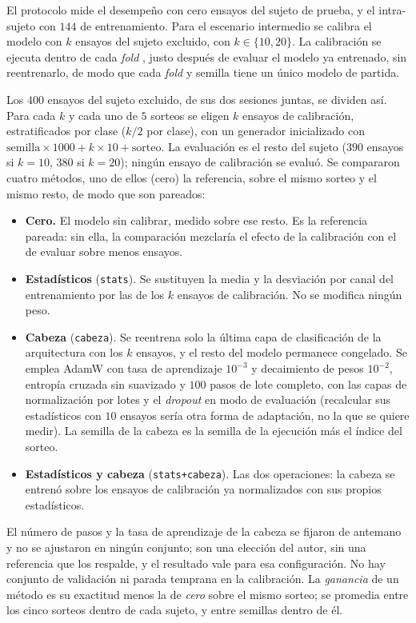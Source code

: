 El protocolo \loso{} mide el desempeño con cero ensayos del sujeto de prueba, y el
intra-sujeto con $144$ de entrenamiento. Para el escenario intermedio se calibra el modelo
con $k$ ensayos del sujeto excluido, con $k \in \{10, 20\}$. La calibración se ejecuta
dentro de cada \textit{fold} \loso{}, justo después de evaluar el modelo ya entrenado, sin
reentrenarlo, de modo que cada \textit{fold} y semilla tiene un único modelo de partida.

Los $400$ ensayos del sujeto excluido, de sus dos sesiones juntas, se dividen así. Para cada
$k$ y cada uno de $5$ sorteos se eligen $k$ ensayos de calibración, estratificados por clase
($k/2$ por clase), con un generador inicializado con $\mathrm{semilla}\times 1000 + k\times 10 +
\mathrm{sorteo}$. La evaluación es el resto del sujeto ($390$ ensayos si $k = 10$, $380$ si
$k = 20$); ningún ensayo de calibración se evaluó. Se compararon cuatro métodos, uno de ellos (cero) la referencia, sobre el mismo
sorteo y el mismo resto, de modo que son pareados:

\begin{itemize}
  \item \textbf{Cero.} El modelo \loso{} sin calibrar, medido sobre ese resto. Es la
  referencia pareada: sin ella, la comparación mezclaría el efecto de la calibración con el
  de evaluar sobre menos ensayos.
  \item \textbf{Estadísticos} (\texttt{stats}). Se sustituyen la media y la desviación por canal del
  entrenamiento por las de los $k$ ensayos de calibración. No se modifica ningún peso.
  \item \textbf{Cabeza} (\texttt{cabeza}). Se reentrena solo la última capa de clasificación de la
  arquitectura con los $k$ ensayos, y el resto del modelo permanece congelado. Se emplea
  AdamW con tasa de aprendizaje $10^{-3}$ y decaimiento de pesos $10^{-2}$, entropía cruzada
  sin suavizado y $100$ pasos de lote completo, con las capas de normalización por lotes y
  el \textit{dropout} en modo de evaluación (recalcular sus estadísticos con $10$ ensayos
  sería otra forma de adaptación, no la que se quiere medir). La semilla de la cabeza es la
  semilla de la ejecución más el índice del sorteo.
  \item \textbf{Estadísticos y cabeza} (\texttt{stats+cabeza}). Las dos operaciones: la cabeza se entrenó sobre los
  ensayos de calibración ya normalizados con sus propios estadísticos.
\end{itemize}

El número de pasos y la tasa de aprendizaje de la cabeza se fijaron de antemano y no se
ajustaron en ningún conjunto; son una elección del autor, sin una referencia que los respalde, y el
resultado vale para esa configuración. No hay conjunto de validación ni parada temprana en la
calibración. La \emph{ganancia} de un método es su exactitud menos la de \emph{cero} sobre
el mismo sorteo; se promedia entre los cinco sorteos dentro de cada sujeto, y entre
semillas dentro de él.

